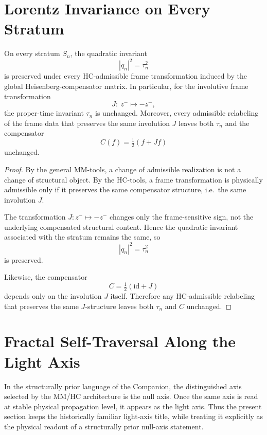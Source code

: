 
\section{Lorentz Invariance on Every Stratum}
\label{sec:lorentz}

\begin{theorem}\label{thm:lorentz}
On every stratum $S_n$, the quadratic invariant
\[
|q_n|^2=\tau_n^2
\]
is preserved under every HC-admissible frame transformation induced by
the global Heisenberg-compensator matrix.
In particular, for the involutive frame transformation
\[
J:\ z^- \mapsto -z^-,
\]
the proper-time invariant $\tau_n$ is unchanged.
Moreover, every admissible relabeling of the frame data that preserves
the same involution $J$ leaves both $\tau_n$ and the compensator
\[
C(f)=\tfrac12(f+Jf)
\]
unchanged.
\end{theorem}

\begin{proof}
By the general MM-tools, a change of admissible realization is not a
change of structural object.
By the HC-tools, a frame transformation is physically admissible only if
it preserves the same compensator structure, i.e.\ the same involution
$J$.

The transformation $J:z^-\mapsto -z^-$ changes only the frame-sensitive
sign, not the underlying compensated structural content.
Hence the quadratic invariant associated with the stratum remains the
same, so
\[
|q_n|^2=\tau_n^2
\]
is preserved.

Likewise, the compensator
\[
C=\tfrac12(\mathrm{id}+J)
\]
depends only on the involution $J$ itself.
Therefore any HC-admissible relabeling that preserves the same
$J$-structure leaves both $\tau_n$ and $C$ unchanged.
\end{proof}


\section{Fractal Self-Traversal Along the Light Axis}
\label{sec:fractal}

\begin{remark}
In the structurally prior language of the Companion, the distinguished
axis selected by the MM/HC architecture is the null axis. Once the same
axis is read at stable physical propagation level, it appears as the
light axis. Thus the present section keeps the historically familiar
light-axis title, while treating it explicitly as the physical readout
of a structurally prior null-axis statement.
\end{remark}

